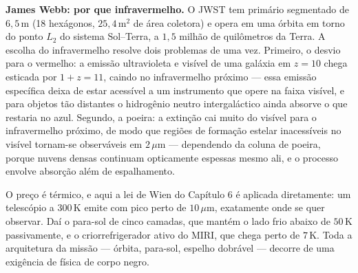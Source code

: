 \documentclass[11pt,a4paper]{article}
\begin{document}
\textbf{James Webb: por que infravermelho.} O JWST tem primário segmentado de $6{,}5\,\mathrm{m}$ (18 hexágonos,
$25{,}4\,\mathrm{m^2}$ de área coletora) e opera em uma órbita em torno do ponto $L_2$ do sistema Sol--Terra, a
$1{,}5$ milhão de quilômetros da Terra. A escolha do infravermelho resolve dois problemas de uma vez. Primeiro, o
desvio para o vermelho: a emissão ultravioleta e visível de uma galáxia em $z=10$ chega esticada por
$1+z=11$, caindo no infravermelho próximo --- essa emissão específica deixa de estar acessível a um instrumento
que opere na faixa visível, e para objetos tão distantes o hidrogênio neutro intergaláctico ainda absorve o que
restaria no azul. Segundo, a poeira: a extinção cai muito do visível para o infravermelho próximo, de modo que
regiões de formação estelar inacessíveis no visível tornam-se observáveis em $2\,\mu\mathrm{m}$ --- dependendo da
coluna de poeira, porque nuvens densas continuam opticamente espessas mesmo ali, e o processo envolve absorção
além de espalhamento.

O preço é térmico, e aqui a lei de Wien do Capítulo 6 é aplicada diretamente: um telescópio a $300\,\mathrm{K}$
emite com pico perto de $10\,\mu\mathrm{m}$, exatamente onde se quer observar. Daí o para-sol de cinco camadas, que
mantém o lado frio abaixo de $50\,\mathrm{K}$ passivamente, e o criorrefrigerador ativo do MIRI, que chega perto de
$7\,\mathrm{K}$. Toda a arquitetura da missão --- órbita, para-sol, espelho dobrável --- decorre de uma exigência
de física de corpo negro.
\end{document}

